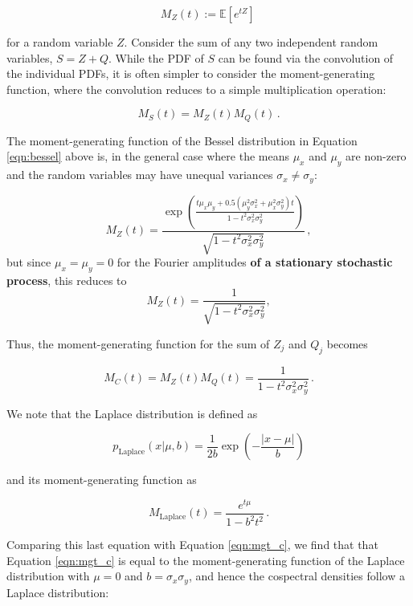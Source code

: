 \documentclass[12pt]{emulateapj}
\begin{document}
\begin{equation}
M_Z(t) := \mathbb{E}[e^{tZ}] \, 
\end{equation}

\noindent for a random variable $Z$. Consider the sum of any two independent random variables, $S = Z + Q$. While the PDF of $S$ can be found via the convolution of the individual PDFs, it is often simpler to consider the moment-generating function, where the convolution reduces to a simple multiplication operation:

\begin{equation}
M_S(t) = M_Z(t) M_Q(t) \, .
\end{equation} 

\noindent The moment-generating function of the Bessel distribution in Equation \ref{eqn:bessel} above is, in the general case \citep{seijas2012} where the means $\mu_x$ and $\mu_y$ are non-zero and the random variables may have unequal variances $\sigma_x \neq \sigma_y$: 

\begin{equation}
M_Z(t) = \frac{\exp{\left( \frac{t\mu_x \mu_y + 0.5 (\mu_y^2 \sigma_x^2 + \mu_x^2 \sigma_y^2) t}{1 - t^2 \sigma_x^2 \sigma_y^2} \right)}}{\sqrt{1 - t^2 \sigma_x^2 \sigma_y^2}}\, ,
\end{equation}
but since $\mu_x = \mu_y = 0$ for the Fourier amplitudes \textbf{of a stationary stochastic process}, this reduces to
\begin{equation}
M_Z(t) =  \frac{1}{\sqrt{1 - t^2 \sigma_x^2 \sigma_y^2}}  \label{eqn:mgf},
\end{equation}

Thus, the moment-generating function for the sum of $Z_j$ and $Q_j$ becomes

\begin{equation}
M_C(t) = M_Z(t) M_Q(t) = \frac{1}{1 - t^2 \sigma_x^2 \sigma_y^2} \, .
\label{eqn:mgt_c}
\end{equation}

\noindent We note that the Laplace distribution is defined as 

\[
p_{\mathrm{Laplace}}(x | \mu, b) = \frac{1}{2b} \exp{\left(-\frac{|x - \mu|}{b} \right)}
\]

\noindent and its moment-generating function as

\[
M_\mathrm{Laplace}(t) = \frac{e^{t\mu}}{1 - b^2 t^2} \, .
\]

Comparing this last equation with Equation \ref{eqn:mgt_c}, we find that that Equation \ref{eqn:mgt_c} is equal to the moment-generating function of the Laplace distribution with $\mu = 0$ and $b = \sigma_x \sigma_y$, and hence the cospectral densities follow a Laplace distribution:
\end{document}

